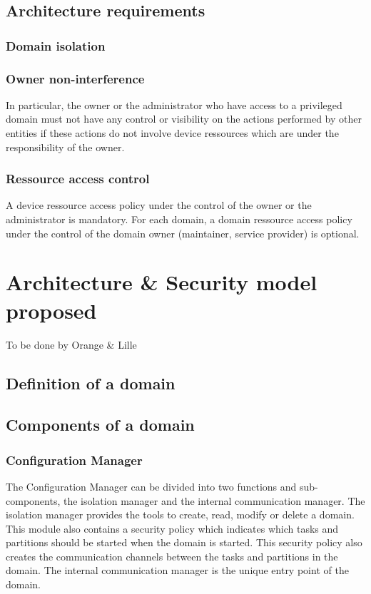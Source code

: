 \documentclass[conference]{IEEEtran}
\begin{document}
\subsection{Architecture requirements}
\label{sec:Arch_req}

\subsubsection{Domain isolation}

\subsubsection{Owner non-interference}
In particular, the owner or the administrator who have access to a privileged domain must not have any control or visibility on the actions performed by other entities if these actions do not involve device ressources which are under the responsibility of the owner.


\subsubsection{Ressource access control}
A device ressource access policy under the control of the owner or the administrator is mandatory. For each domain, a domain ressource access policy under the control of the domain owner (maintainer, service provider) is optional. 

\section{Architecture \& Security model proposed}
\label{sec:Architecture}
To be done by Orange \& Lille
\subsection{Definition of a domain}
\label{sec:Domain_def}

\subsection{Components of a domain}
\label{sec:Domain_comp}

\subsubsection{Configuration Manager}
\label{sec:Config_Mgr}
The Configuration Manager can be divided into two functions and sub-components, the isolation manager and the internal communication manager. The isolation manager provides the tools to create, read, modify or delete a domain. This module also contains a security policy which indicates which tasks and partitions should be started when the domain is started. This security policy also creates the communication channels between the tasks and partitions in the domain. The internal communication manager is the unique entry point of the domain. 
\end{document}
